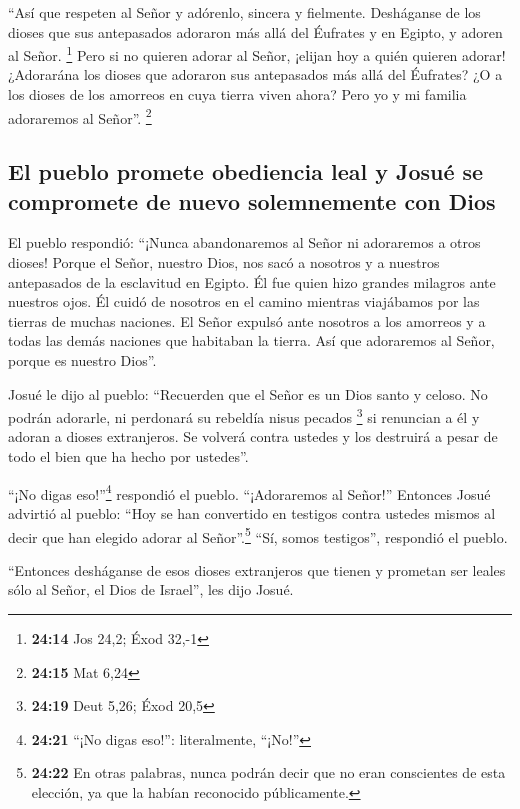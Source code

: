  ``Así que respeten al Señor y adórenlo, sincera y
fielmente. Desháganse de los dioses que sus antepasados adoraron más
allá del Éufrates y en Egipto, y adoren al Señor. \footnote{\textbf{24:14}
  Jos 24,2; Éxod 32,-1}  Pero si no quieren adorar al
Señor, ¡elijan hoy a quién quieren adorar! ¿Adorarána los dioses que
adoraron sus antepasados más allá del Éufrates? ¿O a los dioses de los
amorreos en cuya tierra viven ahora? Pero yo y mi familia adoraremos al
Señor''. \footnote{\textbf{24:15} Mat 6,24}

\hypertarget{el-pueblo-promete-obediencia-leal-y-josuuxe9-se-compromete-de-nuevo-solemnemente-con-dios}{%
\subsection{El pueblo promete obediencia leal y Josué se compromete de
nuevo solemnemente con
Dios}\label{el-pueblo-promete-obediencia-leal-y-josuuxe9-se-compromete-de-nuevo-solemnemente-con-dios}}

 El pueblo respondió: ``¡Nunca abandonaremos al Señor ni
adoraremos a otros dioses!  Porque el Señor, nuestro
Dios, nos sacó a nosotros y a nuestros antepasados de la esclavitud en
Egipto. Él fue quien hizo grandes milagros ante nuestros ojos. Él cuidó
de nosotros en el camino mientras viajábamos por las tierras de muchas
naciones.  El Señor expulsó ante nosotros a los amorreos
y a todas las demás naciones que habitaban la tierra. Así que adoraremos
al Señor, porque es nuestro Dios''.

 Josué le dijo al pueblo: ``Recuerden que el Señor es un
Dios santo y celoso. No podrán adorarle, ni perdonará su rebeldía nisus
pecados \footnote{\textbf{24:19} Deut 5,26; Éxod 20,5} 
si renuncian a él y adoran a dioses extranjeros. Se volverá contra
ustedes y los destruirá a pesar de todo el bien que ha hecho por
ustedes''.

 ``¡No digas eso!''\footnote{\textbf{24:21} ``¡No digas
  eso!'': literalmente, ``¡No!''} respondió el pueblo. ``¡Adoraremos al
Señor!''  Entonces Josué advirtió al pueblo: ``Hoy se han
convertido en testigos contra ustedes mismos al decir que han elegido
adorar al Señor''.\footnote{\textbf{24:22} En otras palabras, nunca
  podrán decir que no eran conscientes de esta elección, ya que la
  habían reconocido públicamente.} ``Sí, somos testigos'', respondió el
pueblo.

 ``Entonces desháganse de esos dioses extranjeros que
tienen y prometan ser leales sólo al Señor, el Dios de Israel'', les
dijo Josué.

